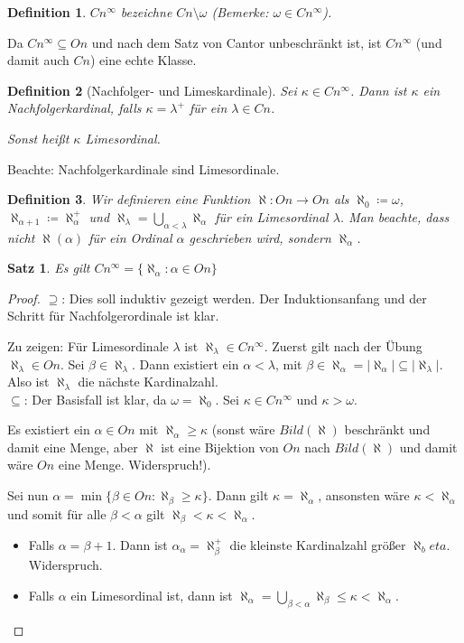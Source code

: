 \documentclass[german]{article}
\theoremstyle{break}
\theoremstyle{def_style}
\newtheorem{definition}{Definition}[section]
\theoremstyle{def_style}
\newtheorem{satz}{Satz}[section]
\theoremstyle{lemma_style}
\begin{document}
\begin{definition}
	$Cn^\infty$ bezeichne $Cn\setminus\omega$ (Bemerke: $\omega\in Cn^\infty$).
\end{definition}

Da $Cn^\infty\subseteq On$ und nach dem Satz von Cantor unbeschränkt ist, ist $Cn^\infty$ (und damit auch $Cn$) eine echte Klasse.

\begin{definition}[Nachfolger- und Limeskardinale]
	Sei $\kappa\in Cn^\infty$. Dann ist $\kappa$ ein \textit{Nachfolgerkardinal}, falls $\kappa=\lambda^+$ für ein $\lambda\in Cn$.
	
	Sonst heißt $\kappa$ \textit{Limesordinal}.
\end{definition}

Beachte: Nachfolgerkardinale sind Limesordinale.

\begin{definition}
	Wir definieren eine Funktion $\aleph:On\to On$ als $\aleph_0\coloneqq\omega$, $\aleph_{\alpha+1}\coloneqq \aleph_\alpha^+$ und $\aleph_\lambda=\bigcup_{\alpha<\lambda}\aleph_\alpha$ für ein Limesordinal $\lambda$. Man beachte, dass nicht $\aleph(\alpha)$ für ein Ordinal $\alpha$ geschrieben wird, sondern $\aleph_\alpha$.
\end{definition}

\begin{satz}
	Es gilt $Cn^\infty=\{\aleph_\alpha : \alpha\in On\}$
\end{satz}
\begin{proof}
	$\supseteq$: Dies soll induktiv gezeigt werden. Der Induktionsanfang und der Schritt für Nachfolgerordinale ist klar.
	
	Zu zeigen: Für Limesordinale $\lambda$ ist $\aleph_\lambda\in Cn^\infty$. Zuerst gilt nach der Übung $\aleph_\lambda\in On$. Sei $\beta\in \aleph_\lambda$. Dann existiert ein $\alpha<\lambda$, mit $\beta\in \aleph_\alpha=\vert\aleph_\alpha\vert\subseteq\vert \aleph_\lambda\vert$. Also ist $\aleph_\lambda$ die nächste Kardinalzahl.
	\\
	
	$\subseteq$: Der Basisfall ist klar, da $\omega=\aleph_0$. Sei $\kappa\in Cn^\infty$ und $\kappa>\omega$.
	
	Es existiert ein $\alpha\in On$ mit $\aleph_\alpha\geq\kappa$ (sonst wäre $Bild(\aleph)$ beschränkt und damit eine Menge, aber $\aleph$ ist eine Bijektion von $On$ nach $Bild(\aleph)$ und damit wäre $On$ eine Menge. Widerspruch!).
		
	Sei nun $\alpha=\min\{\beta\in On : \aleph_\beta \geq \kappa\}$. Dann gilt $\kappa=\aleph_\alpha$, ansonsten wäre $\kappa<\aleph_\alpha$ und somit für alle $\beta<\alpha$ gilt $\aleph_\beta < \kappa < \aleph_\alpha$.
	\begin{itemize}
		\item Falls $\alpha=\beta+1$. Dann ist $\alpha_\alpha=\aleph_\beta^+$ die kleinste Kardinalzahl größer $\aleph_beta$. Widerspruch.
		\item Falls $\alpha$ ein Limesordinal ist, dann ist $\aleph_\alpha=\bigcup_{\beta<\alpha}\aleph_\beta\leq \kappa < \aleph_\alpha$.
	\end{itemize}
\end{proof}
\end{document}
